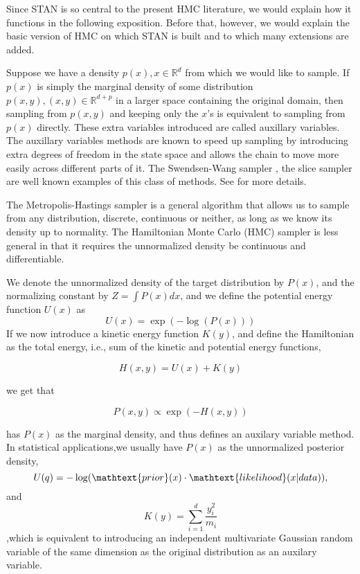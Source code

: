 \documentclass{book}
\begin{document}
\begin{enumerate}
Since STAN is so central to the present HMC literature, we would explain how it functions in the following exposition. Before that, however, we would explain the basic version of HMC on which STAN is built and to which many extensions are added. 


Suppose we have a density $p(x),x \in \mathbb{R}^d$ from which we would like to
sample. If $p(x)$ is simply the marginal density of some distribution $p(x,y),
(x,y) \in \mathbb{R}^{d+p}$ in a larger space containing the original domain, then sampling from $p(x,y)$ and keeping only the $x$'s is equivalent to sampling from $p(x)$ directly. These extra variables introduced are called auxillary variables. The auxillary variables methods are known to speed up sampling by introducing extra degrees of freedom in the state space and allows the chain to move more easily across different parts of it. The Swendsen-Wang sampler \cite{wang1990cluster}, the slice sampler\cite{wang1990cluster} are well known examples of this class of methods. See \cite{liang2011advanced,liu2008monte} for more details.

The Metropolis-Hastings sampler is a general algorithm that allows us to sample from any distribution, discrete, continuous or neither, as long as we know its density up to normality. The Hamiltonian Monte Carlo (HMC) sampler is less general in that it requires the unnormalized density be continuous and differentiable. 

We denote the unnormalized density of the target distribution by $P(x)$, and the normalizing constant by $Z = \int P(x)dx $, and we define the potential energy function $U(x)$ as 
\[ U(x) =  \exp(-\log(P(x))) \]
If we now introduce a kinetic energy function $K(y)$, and define
the Hamiltonian as the total energy, i.e., sum of the kinetic and potential energy functions, 

\[ H(x,y) = U(x) + K(y) \]

we get that 

\[P(x,y) \propto  \exp(-H(x,y)) \]

has $P(x)$ as the marginal density, and thus defines an auxilary variable method. In statistical applications,we usually have $P(x)$ as the unnormalized posterior
density, 
\[U(q) = -\log(\mathtext{prior}(x) \cdot \mathtext{likelihood}(x|data) ), \]
and 
\[K(y) = \sum_{i=1}^d \frac{y_i^2}{m_i} \]
,which is equivalent to introducing an independent multivariate Gaussian random variable of
the same dimension as the original distribution as an auxilary variable. 


\end{enumerate}
\end{document}
